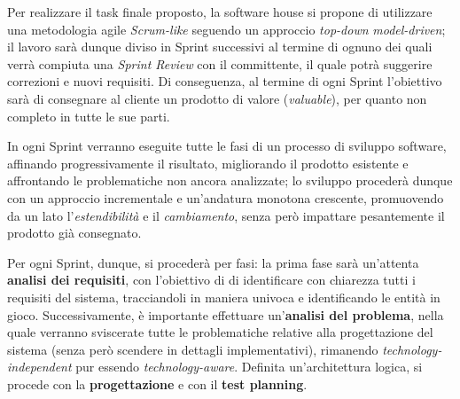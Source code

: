 

Per realizzare il task finale proposto, la software house si propone di utilizzare una metodologia agile \textit{Scrum-like}
seguendo un approccio \textit{top-down} \textit{model-driven};
il lavoro sarà dunque diviso in Sprint successivi al termine di ognuno dei quali verrà compiuta una \textit{Sprint Review}
con il committente, il quale potrà suggerire correzioni e nuovi requisiti.
Di conseguenza, al termine di ogni Sprint l'obiettivo sarà di consegnare al cliente un prodotto di valore (\textit{valuable}),
per quanto non completo in tutte le sue parti.

In ogni Sprint verranno eseguite tutte le fasi di un processo di sviluppo software, affinando progressivamente il risultato,
migliorando il prodotto esistente e affrontando le problematiche non ancora analizzate;
lo sviluppo procederà dunque con un approccio incrementale e un'andatura monotona crescente, promuovendo da un lato
l'\textit{estendibilità} e il \textit{cambiamento}, senza però impattare pesantemente il prodotto già consegnato.

Per ogni Sprint, dunque, si procederà per fasi:
la prima fase sarà un'attenta \textbf{analisi dei requisiti}, con l'obiettivo di di identificare con chiarezza
tutti i requisiti del sistema, tracciandoli in maniera univoca e identificando le entità in gioco.
Successivamente, è importante effettuare un'\textbf{analisi del problema}, nella quale verranno sviscerate tutte le problematiche
relative alla progettazione del sistema (senza però scendere in dettagli implementativi),
rimanendo \textit{technology-independent} pur essendo \textit{technology-aware}.
Definita un'architettura logica, si procede con la \textbf{progettazione} e con il \textbf{test planning}.
